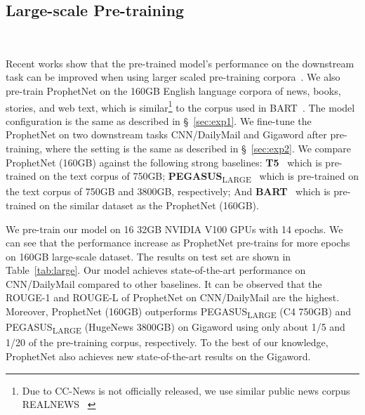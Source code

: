 \documentclass[11pt,a4paper]{article}
\begin{document}
\subsection{Large-scale Pre-training}~\label{sec:exp4}







Recent works show that the pre-trained model's performance on the downstream task can be improved when using larger scaled pre-training corpora~\cite{lewis2019bart, raffel2019exploring}. 
We also pre-train ProphetNet on the 160GB English language corpora of news, books, stories, and web text, which is similar\footnote{Due to CC-News is not officially released, we use similar public news corpus REALNEWS ~\cite{zellers2019defending}} to the corpus used in BART~\cite{lewis2019bart}.
The model configuration is the same as described in \S~\ref{sec:exp1}.
We fine-tune the ProphetNet on two downstream tasks CNN/DailyMail and Gigaword after pre-training, where the setting is the same as described in \S~\ref{sec:exp2}. 
We compare ProphetNet (160GB) against the following strong baselines: \textbf{T5}~\cite{raffel2019exploring} which is pre-trained on the text corpus of 750GB; \textbf{PEGASUS}\textsubscript{LARGE}~\cite{zhang2019pegasus} which is pre-trained on the text corpus of 750GB and 3800GB, respectively; And \textbf{BART}~\cite{lewis2019bart} which is pre-trained on the similar dataset as the ProphetNet (160GB).

We pre-train our model on 16  32GB NVIDIA V100 GPUs with 14 epochs.  We can see that the performance increase as ProphetNet pre-trains for more epochs on 160GB large-scale dataset.  The results on test set are shown in Table~\ref{tab:large}.   
Our model achieves state-of-the-art performance on CNN/DailyMail compared to other baselines.
It can be observed that the ROUGE-1 and ROUGE-L of ProphetNet on CNN/DailyMail are the highest.
Moreover, ProphetNet (160GB) outperforms PEGASUS\textsubscript{LARGE} (C4 750GB) and PEGASUS\textsubscript{LARGE} (HugeNews 3800GB) on Gigaword using only about 1/5 and 1/20 of the pre-training corpus, respectively. To the best of our knowledge, ProphetNet also achieves new state-of-the-art results on the Gigaword. 
\end{document}
